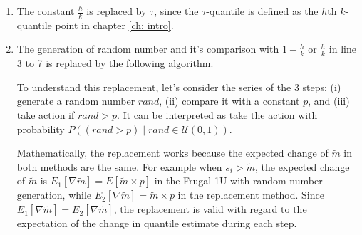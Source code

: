 \begin{enumerate}
    \item The constant $\frac{h}{k}$ is replaced by $\tau$, since the $\tau$-quantile is defined
     as the $h$th $k$-quantile point in chapter \ref{ch: intro}.
    \item The generation of random number and it's comparison with $1-\frac{h}{k}$ or $\frac{h}{k}$
    in line 3 to 7 is replaced by the following algorithm.
    \begin{algorithm}
        \begin{algorithmic}[1]
            \setcounter{ALG@line}{2}
            \State{ }   
            \EndIf 
        \end{algorithmic}
    \end{algorithm}

    
    To understand this replacement, let's consider the series of the 3 steps: 
    (i) generate a random number $rand$, 
    (ii) compare it with a constant $p$, and
    (iii) take action if $rand > p$. 
    It can be interpreted as take the action with probability 
    $P((rand > p) \mid rand \in \mathcal{U}(0,1))$. 

    Mathematically, the replacement works because the expected change of
    $\tilde{m}$ in both methods are the same. 
    For example when $s_i > \tilde{m}$, 
    the expected change of $\tilde{m}$ is
    $E_1[\nabla \tilde{m}] = E[\tilde{m} \times p]$ in the Frugal-1U with 
    random number generation,
    while 
    $E_2[\nabla \tilde{m}] = \tilde{m} \times p$ in the replacement method.
    Since $E_1[\nabla \tilde{m}] = E_2[\nabla \tilde{m}]$, the replacement is valid
    with regard to the expectation of the change in quantile estimate during each step.

\end{enumerate}


